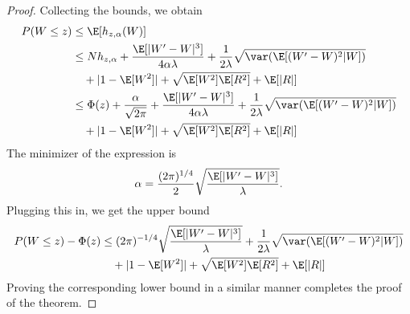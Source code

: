 \begin{proof}
  Collecting the bounds, we obtain
  \begin{equation}
    \begin{split}
      P(W \leq z) &\leq \E [h_{z,\alpha}(W)] \\
      &\leq Nh_{z,\alpha} + \frac{\E [|W'-W|^3]}{4 \alpha \lambda}
      + \frac{1}{2\lambda} \sqrt{\var (\E [(W'-W)^2|W])} \\
      &\quad + |1 - \E [W^2]| + \sqrt{\E [W^2]\E [R^2]} + \E [|R|] \\
      &\leq \Phi (z) + \frac{\alpha}{\sqrt{2\pi}} + \frac{\E [|W'-W|^3]}{4 \alpha \lambda}
      + \frac{1}{2\lambda} \sqrt{\var (\E [(W'-W)^2|W])} \\
      &\quad + |1 - \E [W^2]| + \sqrt{\E [W^2]\E [R^2]} + \E [|R|]
    \end{split}
  \end{equation}
  The minimizer of the expression is
  \begin{equation}
    \alpha = \frac{(2\pi)^{1/4}}{2}\sqrt{\frac{\E [|W'-W|^3]}{\lambda}}.
  \end{equation}
  Plugging this in, we get the upper bound
  \begin{equation}
    \begin{split}
      P(W \leq z) - \Phi(z) &\leq (2\pi)^{-1/4} \sqrt{\frac{\E [|W'-W|^3]}{\lambda}}
      + \frac{1}{2\lambda} \sqrt{\var (\E [(W'-W)^2|W])} \\
      &\quad + |1 - \E [W^2]| + \sqrt{\E [W^2]\E [R^2]} + \E [|R|]
    \end{split}
  \end{equation}
  Proving the corresponding lower bound in a similar manner completes the proof of the theorem.
\end{proof}